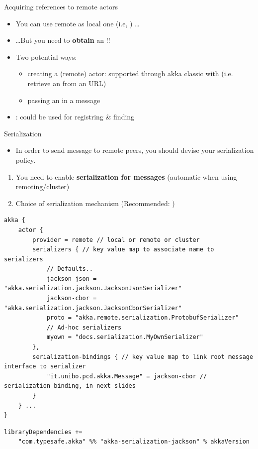 \documentclass[presentation, 9pt]{beamer}\mode<presentation>{\usetheme{AMSBolognaFC}}
\begin{document}
\begin{frame}[c]{Acquiring references to remote actors}
	\begin{itemize}
		\item You can use remote  as local one (i.e, ) \dots
  	\item[\faExclamation] \dots But you need to \textbf{obtain} an !!
   	\item Two potential ways:
    \begin{itemize}
			\item creating a (remote) actor: supported through akka classic with  (i.e. retrieve an  from an URL)
   		\item passing an  in a message
		\end{itemize}
		\item {}:  could be used for registring \& finding  
	\end{itemize}
\end{frame}
\begin{frame}[fragile, c]{Serialization \href{https://doc.akka.io/docs/akka/current/serialization.html}{\faLink}}
	\begin{itemize}
		\item In order to send message to remote peers, you should devise your serialization policy.
	\end{itemize}
	\begin{enumerate}
		\item You need to enable \textbf{serialization for messages} (automatic when using remoting/cluster)
  	\item Choice of serialization mechanism (Recommended: )
	\end{enumerate}
	\begin{tcolorbox}[left=0pt, top=0pt, bottom=0pt, title=application.conf]
		\begin{verbatim}
akka {
	actor {
		provider = remote // local or remote or cluster 
		serializers { // key value map to associate name to serializers
			// Defaults..
			jackson-json = "akka.serialization.jackson.JacksonJsonSerializer"
			jackson-cbor = "akka.serialization.jackson.JacksonCborSerializer"
			proto = "akka.remote.serialization.ProtobufSerializer"
			// Ad-hoc serializers
			myown = "docs.serialization.MyOwnSerializer"
		},
		serialization-bindings { // key value map to link root message interface to serializer
			"it.unibo.pcd.akka.Message" = jackson-cbor // serialization binding, in next slides
		}
	} ...
}
		\end{verbatim}
		\end{tcolorbox}
		\begin{tcolorbox}[left=0pt, top=0pt, bottom=0pt, title=Include the dependency on your serialisers.]
			\begin{verbatim}
libraryDependencies +=
	"com.typesafe.akka" %% "akka-serialization-jackson" % akkaVersion
		\end{verbatim}
		\end{tcolorbox}
\end{frame}
\end{document}
